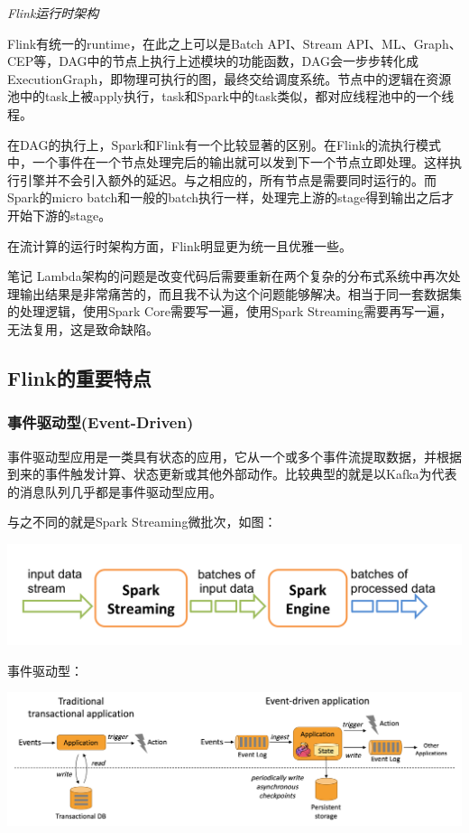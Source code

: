 \documentclass{ctexart}
\begin{document}
\textit{Flink运行时架构}

Flink有统一的runtime，在此之上可以是Batch API、Stream API、ML、Graph、CEP等，DAG中的节点上执行上述模块的功能函数，DAG会一步步转化成ExecutionGraph，即物理可执行的图，最终交给调度系统。节点中的逻辑在资源池中的task上被apply执行，task和Spark中的task类似，都对应线程池中的一个线程。

在DAG的执行上，Spark和Flink有一个比较显著的区别。在Flink的流执行模式中，一个事件在一个节点处理完后的输出就可以发到下一个节点立即处理。这样执行引擎并不会引入额外的延迟。与之相应的，所有节点是需要同时运行的。而Spark的micro batch和一般的batch执行一样，处理完上游的stage得到输出之后才开始下游的stage。

在流计算的运行时架构方面，Flink明显更为统一且优雅一些。

\begin{bclogo}[logo=\bcinfo, couleurBarre=orange, noborder=true, couleur=white]{笔记}
Lambda架构的问题是改变代码后需要重新在两个复杂的分布式系统中再次处理输出结果是非常痛苦的，而且我不认为这个问题能够解决。相当于同一套数据集的处理逻辑，使用Spark Core需要写一遍，使用Spark Streaming需要再写一遍，无法复用，这是致命缺陷。
\end{bclogo}

\subsection{Flink的重要特点}

\subsubsection{事件驱动型(Event-Driven)}

事件驱动型应用是一类具有状态的应用，它从一个或多个事件流提取数据，并根据到来的事件触发计算、状态更新或其他外部动作。比较典型的就是以Kafka为代表的消息队列几乎都是事件驱动型应用。

与之不同的就是Spark Streaming微批次，如图：

\includegraphics[width=\textwidth]{streaming-flow.png}

事件驱动型：

\includegraphics[width=\textwidth]{usecases-eventdrivenapps.png}
\end{document}
